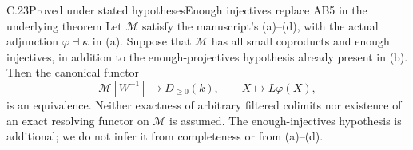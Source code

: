 \begin{claim}{C.23}{Proved under stated hypotheses}{Enough injectives replace AB5 in the underlying theorem}\label{C23}
Let $\mathcal M$ satisfy the manuscript's (a)--(d), with the actual adjunction $\varphi\dashv\kappa$ in (a). Suppose that $\mathcal M$ has all small coproducts and enough injectives, in addition to the enough-projectives hypothesis already present in (b). Then the canonical functor
\[
 \mathcal M[W^{-1}]\longrightarrow D_{\geq0}(k),
 \qquad X\longmapsto L\varphi(X),
\]
is an equivalence. Neither exactness of arbitrary filtered colimits nor existence of an exact resolving functor on $\mathcal M$ is assumed. The enough-injectives hypothesis is additional; we do not infer it from completeness or from (a)--(d).
\end{claim}
